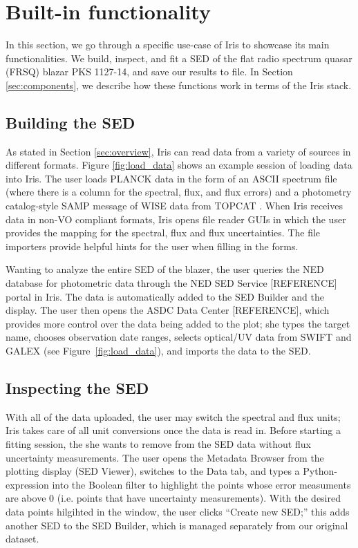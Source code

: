 \section{Built-in functionality}
\label{sec:builtin}

In this section, we go through a specific use-case of Iris to showcase its main functionalities. We build, inspect, and fit a SED of the flat radio spectrum quasar (FRSQ) blazar PKS 1127-14, and save our results to file. In Section \ref{sec:components}, we describe how these functions work in terms of the Iris stack.

\subsection{Building the SED}

As stated in Section \ref{sec:overview}, Iris can read data from a variety of sources in different formats. Figure \ref{fig:load_data} shows an example session of loading data into Iris. The user loads PLANCK data in the form of an ASCII spectrum file (where there is a column for the spectral, flux, and flux errors) and a photometry catalog-style SAMP message of WISE data from TOPCAT \citep{2005ASPC..347...29T}. When Iris receives data in non-VO compliant formats, Iris opens file reader GUIs in which the user provides the mapping for the spectral, flux and flux uncertainties. The file importers provide helpful hints for the user when filling in the forms.

Wanting to analyze the entire SED of the blazer, the user queries the NED database for photometric data through the NED SED Service [REFERENCE] portal in Iris. The data is automatically added to the SED Builder and the display. The user then opens the ASDC Data Center [REFERENCE], which provides more control over the data being added to the plot; she types the target name, chooses observation date ranges, selects optical/UV data from SWIFT and GALEX (see Figure~\ref{fig:load_data}), and imports the data to the SED.

\subsection{Inspecting the SED}

With all of the data uploaded, the user may switch the spectral and flux units; Iris takes care of all unit conversions once the data is read in. Before starting a fitting session, the she wants to remove from the SED data without flux uncertainty measurements. The user opens the Metadata Browser from the plotting display (SED Viewer), switches to the Data tab, and types a Python-expression into the Boolean filter to highlight the points whose error measuments are above 0 (i.e. points that have uncertainty measurements). With the desired data points hilgihted in the window, the user clicks ``Create new SED;'' this adds another SED to the SED Builder, which is managed separately from our original dataset.

